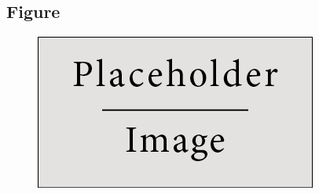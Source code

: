 \subsection{Figure}

\begin{figure}[h]
\centering\includegraphics[width=0.4\linewidth]{placeholder}
\end{figure}

\clearpage

